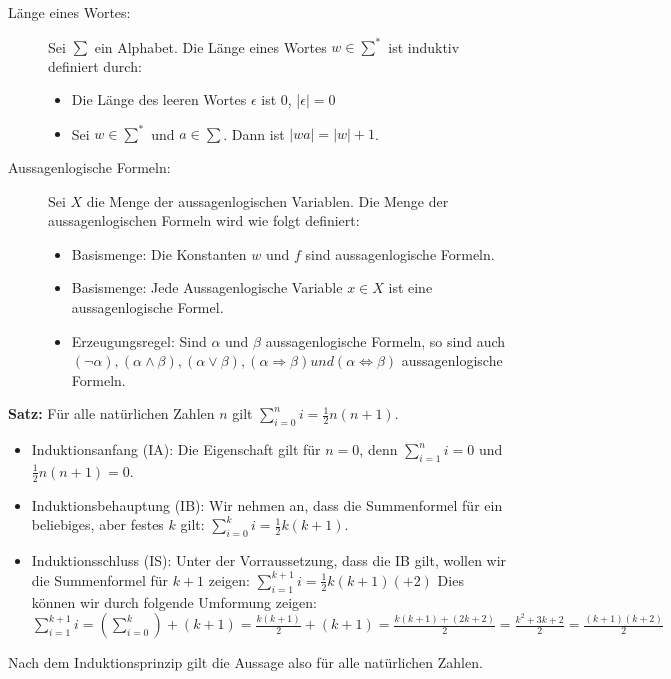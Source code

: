 \begin{description}
  \item [Länge eines Wortes:]
    Sei $\sum$ ein Alphabet. Die Länge eines Wortes $w \in \sum^*$ ist induktiv
    definiert durch:
    \begin{itemize}
      \setlength{\itemsep}{-0.1cm}
      \item Die Länge des leeren Wortes $\epsilon$ ist $0$, |$\epsilon| = 0$
      \item Sei $w \in \sum^*$ und $a \in \sum$. Dann ist $|wa| = |w| + 1$. 
    \end{itemize}

  \item [Aussagenlogische Formeln:]
    Sei $X$ die Menge der aussagenlogischen Variablen. Die Menge der 
    aussagenlogischen Formeln wird wie folgt definiert:
    \begin{itemize}
      \setlength{\itemsep}{-0.1cm}
      \item Basismenge: Die Konstanten $w$ und $f$ sind aussagenlogische Formeln.
      \item Basismenge: Jede Aussagenlogische Variable $x \in X$ ist eine 
            aussagenlogische Formel.
      \item Erzeugungsregel: Sind $\alpha$ und $\beta$ aussagenlogische Formeln, 
            so sind auch 
            $(\neg \alpha), (\alpha \wedge \beta), (\alpha \vee \beta), 
            (\alpha \Rightarrow \beta) und (\alpha \Leftrightarrow \beta)$ 
            aussagenlogische Formeln.
    \end{itemize}
\end{description}


\begin{framed} 
  \textbf{Satz:} Für alle natürlichen Zahlen $n$ gilt 
                 $\sum_{i=0}^{n} i = \frac{1}{2}n(n + 1)$.
  \begin{itemize}
    \setlength{\itemsep}{-0.1cm}
    \item Induktionsanfang (IA): Die Eigenschaft gilt für $n = 0$, denn 
          $\sum_{i=1}^{n} i = 0$ und $\frac{1}{2}n(n + 1) = 0$.
    \item Induktionsbehauptung (IB): Wir nehmen an, dass die Summenformel für 
          ein beliebiges, aber festes $k$ gilt: 
          $\sum_{i=0}^{k} i = \frac{1}{2}k(k + 1)$.
    \item Induktionsschluss (IS): Unter der Vorraussetzung, dass die IB gilt, 
          wollen wir die Summenformel für $k + 1$ zeigen: 
          $\sum_{i=1}^{k+1}i = \frac{1}{2}k(k + 1)(+2)$ Dies können wir durch 
          folgende Umformung zeigen:\\
          $\sum_{i=1}^{k+1}i = (\sum_{i=0}^{k})+(k+1) = \frac{k(k+1)}{2}+(k+1) =
          \frac{k(k+1)+(2k+2)}{2} = \frac{k^2+3k+2}{2} = \frac{(k+1)(k+2)}{2}$
  \end{itemize}
  Nach dem Induktionsprinzip gilt die Aussage also für alle natürlichen Zahlen.
\end{framed}

